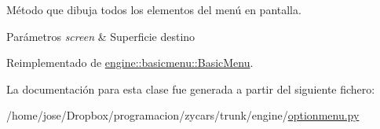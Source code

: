 \-Método que dibuja todos los elementos del menú en pantalla. 


\begin{DoxyParams}{\-Parámetros}
{\em screen} & \-Superficie destino \\
\hline
\end{DoxyParams}


\-Reimplementado de \hyperlink{classengine_1_1basicmenu_1_1BasicMenu_a9aa29d8e353d2d3329597f5fbbf125b3}{engine\-::basicmenu\-::\-Basic\-Menu}.



\-La documentación para esta clase fue generada a partir del siguiente fichero\-:\begin{DoxyCompactItemize}
\item 
/home/jose/\-Dropbox/programacion/zycars/trunk/engine/\hyperlink{optionmenu_8py}{optionmenu.\-py}\end{DoxyCompactItemize}
